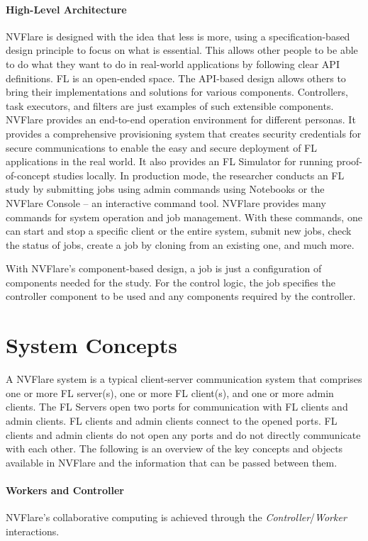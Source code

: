 \documentclass[11pt]{article}
\begin{document}
\paragraph{High-Level Architecture} NVFlare is designed with the idea that less is more, using a specification-based design principle to focus on what is essential.
%
This allows other people to be able to do what they want to do in real-world applications by following clear API definitions. FL is an open-ended space. The API-based design allows others to bring their implementations and solutions for various components. Controllers, task executors, and filters are just examples of such extensible components. 
%
NVFlare provides an end-to-end operation environment for different personas. It provides a comprehensive provisioning system that creates security credentials for secure communications to enable the easy and secure deployment of FL applications in the real world. It also provides an FL Simulator for running proof-of-concept studies locally.
%
In production mode, the researcher conducts an FL study by submitting jobs using admin commands using Notebooks or the NVFlare Console -- an interactive command tool. NVFlare provides many commands for system operation and job management. With these commands, one can start and stop a specific client or the entire system, submit new jobs, check the status of jobs, create a job by cloning from an existing one, and much more.

%
With NVFlare's component-based design, a job is just a configuration of components needed for the study. For the control logic, the job specifies the controller component to be used and any components required by the controller. 
%
\section{System Concepts}
%
A NVFlare system is a typical client-server communication system that comprises one or more FL server(s), one or more FL client(s), and one or more admin clients. The FL Servers open two ports for communication with FL clients and admin clients. FL clients and admin clients connect to the opened ports. FL clients and admin clients do not open any ports and do not directly communicate with each other.
%
The following is an overview of the key concepts and objects available in NVFlare and the information that can be passed between them.

\paragraph{Workers and Controller} NVFlare’s collaborative computing is achieved through the \textit{Controller}/\textit{Worker} interactions. 
\end{document}
